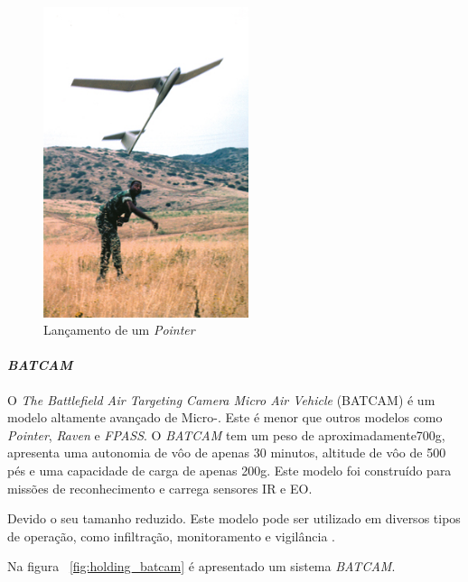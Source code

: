 \begin{figure}[h!]
\centering
\includegraphics[width=6cm]{pictures/launching_pointer.jpg}
\caption{Lançamento de um \emph{Pointer} }
 \label{fig:launching_pointer}
\end{figure}


\paragraph{ \emph{BATCAM}}
O \emph{The Battlefield Air Targeting Camera Micro Air
Vehicle} (BATCAM) é um modelo altamente avançado de Micro-\vant. Este \vant  é menor que outros modelos como \emph{Pointer}, \emph{Raven} e \emph{FPASS}.
O \emph{BATCAM} tem um peso de aproximadamente700g, apresenta uma autonomia de vôo de apenas 30 minutos, altitude de vôo de 500 pés e uma capacidade de carga de
apenas 200g. Este modelo foi construído para missões de reconhecimento e carrega sensores IR e EO.

Devido o seu tamanho reduzido. Este modelo pode ser utilizado em diversos tipos de operação, como infiltração, monitoramento e vigilância \cite{Drew2005}. 


Na figura ~\ref{fig:holding_batcam} é apresentado um sistema \emph{BATCAM}.

